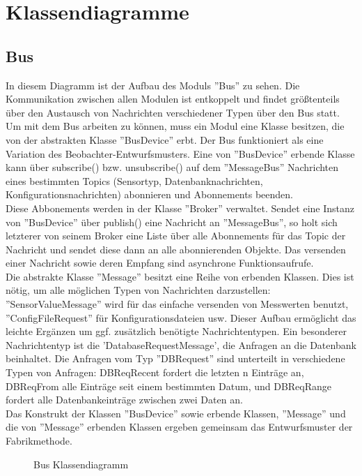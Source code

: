 \documentclass[entwurf.tex]{subfiles}
\begin{document}
\chapter{Klassendiagramme}
	\section{Bus}
		
  		In diesem Diagramm ist der Aufbau des Moduls ''Bus'' zu sehen. Die Kommunikation zwischen allen Modulen ist entkoppelt und findet größtenteils über den Austausch von Nachrichten verschiedener Typen über den Bus statt. Um mit dem Bus arbeiten zu können, muss ein Modul eine Klasse besitzen, die von der abstrakten Klasse ''BusDevice'' erbt. Der Bus funktioniert als eine Variation des Beobachter-Entwurfsmusters. Eine von ''BusDevice'' erbende Klasse kann über subscribe() bzw. unsubscribe() auf dem ''MessageBus'' Nachrichten eines bestimmten Topics (Sensortyp, Datenbanknachrichten, Konfigurationsnachrichten) abonnieren und Abonnements beenden. \\
  		Diese Abbonements werden in der Klasse ''Broker'' verwaltet. Sendet eine Instanz von ''BusDevice'' über publish() eine Nachricht an ''MessageBus'', so holt sich letzterer von seinem Broker eine Liste über alle Abonnements für das Topic der Nachricht und sendet diese dann an alle abonnierenden Objekte. Das versenden einer Nachricht sowie deren Empfang sind asynchrone Funktionsaufrufe. \\
  		Die abstrakte Klasse ''Message'' besitzt eine Reihe von erbenden Klassen. Dies ist nötig, um alle möglichen Typen von Nachrichten darzustellen: ''SensorValueMessage'' wird für das einfache versenden von Messwerten benutzt, ''ConfigFileRequest'' für Konfigurationsdateien usw. Dieser Aufbau ermöglicht das leichte Ergänzen um ggf. zusätzlich benötigte Nachrichtentypen. Ein besonderer Nachrichtentyp ist die 'DatabaseRequestMessage', die Anfragen an die Datenbank beinhaltet. Die Anfragen vom Typ ''DBRequest'' sind unterteilt in verschiedene Typen von Anfragen: DBReqRecent fordert die letzten n Einträge an, DBReqFrom alle Einträge seit einem bestimmten Datum, und DBReqRange fordert alle Datenbankeinträge zwischen zwei Daten an. \\
  		Das Konstrukt der Klassen ''BusDevice'' sowie erbende Klassen, ''Message'' und die von ''Message'' erbenden Klassen ergeben gemeinsam das Entwurfsmuster der Fabrikmethode.
  		
  		\begin{figure}[H]
  			\begin{center}
  				\caption{Bus Klassendiagramm}
  			\end{center}
  		\end{figure}
  	
\end{document}
